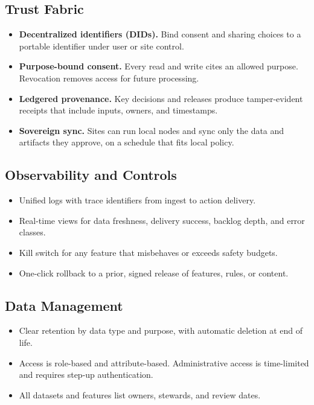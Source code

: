 \documentclass[12pt]{article}
\begin{document}
\subsection*{Trust Fabric}
\begin{itemize}[leftmargin=*]
  \item \textbf{Decentralized identifiers (DIDs).} Bind consent and sharing choices to a portable identifier under user or site control.
  \item \textbf{Purpose-bound consent.} Every read and write cites an allowed purpose. Revocation removes access for future processing.
  \item \textbf{Ledgered provenance.} Key decisions and releases produce tamper-evident receipts that include inputs, owners, and timestamps.
  \item \textbf{Sovereign sync.} Sites can run local nodes and sync only the data and artifacts they approve, on a schedule that fits local policy.
\end{itemize}

\subsection*{Observability and Controls}
\begin{itemize}[leftmargin=*]
  \item Unified logs with trace identifiers from ingest to action delivery.
  \item Real-time views for data freshness, delivery success, backlog depth, and error classes.
  \item Kill switch for any feature that misbehaves or exceeds safety budgets.
  \item One-click rollback to a prior, signed release of features, rules, or content.
\end{itemize}

\subsection*{Data Management}
\begin{itemize}[leftmargin=*]
  \item Clear retention by data type and purpose, with automatic deletion at end of life.
  \item Access is role-based and attribute-based. Administrative access is time-limited and requires step-up authentication.
  \item All datasets and features list owners, stewards, and review dates.
\end{itemize}
\end{document}
